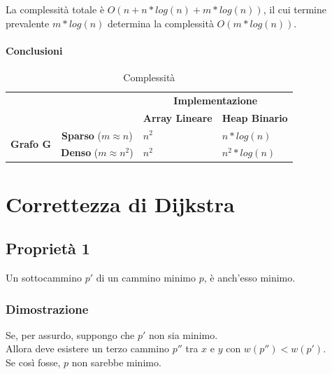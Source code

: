 \documentclass[tikz]{article}
\let\oldparagraph\paragraph
\renewcommand{\paragraph}[1]{\oldparagraph{#1}\mbox{}}
\begin{document}
{{La complessità totale è $O(n+n*log(n)+m*log(n))$, il cui termine prevalente $m*log(n)$ determina la complessità $O(m*log(n))$.

\paragraph{Conclusioni}

\begin{table}[h]
\centering
\caption{Complessità}
\label{my-label}
\begin{tabular}{ll|l|l|}
\cline{3-4}
                                                        &                                      & \multicolumn{2}{c|}{\textbf{Implementazione}}                                            \\ \cline{3-4} 
                                                        &                                      & \multicolumn{1}{c|}{\textbf{Array Lineare}} & \multicolumn{1}{c|}{\textbf{Heap Binario}} \\ \hline
\multicolumn{1}{|c|}{\multirow{2}{*}{\textbf{Grafo G}}} & \multicolumn{1}{c|}{\textbf{Sparso} ($m \approx n$)} & $n^2$                                         & $n*log(n)$                                        \\ \cline{2-4} 
\multicolumn{1}{|c|}{}                                  & \multicolumn{1}{c|}{\textbf{Denso}  ($m \approx n^2$)}  & $n^2$                                         & $n^2*log(n)$                                                                               \\ \hline
\end{tabular}
\end{table}

\section{Correttezza di Dijkstra}

\subsection{Proprietà 1}

Un sottocammino $p'$ di un cammino minimo $p$, è anch'esso minimo.

\subsubsection{Dimostrazione}

Se, per assurdo, suppongo che $p'$ non sia minimo.\\
Allora deve esistere un terzo cammino $p''$ tra $x$ e $y$ con $w(p'') < w(p')$.\\
Se così fosse, $p$ non sarebbe minimo.

}}
\end{document}

